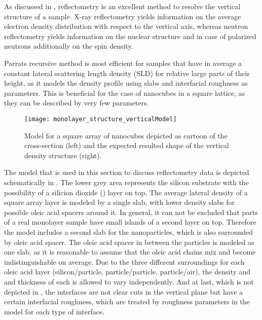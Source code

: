 \documentclass[\main/dresen_thesis.tex]{subfiles}
\begin{document}
  As discussed in , reflectometry is an excellent method to resolve the vertical structure of a sample.
  X-ray reflectometry yields information on the average electron density distribution with respect to the vertical axis, whereas neutron reflectometry yields information on the nuclear structure and in case of polarized neutrons additionally on the spin density.

  Parrats recursive method is most efficient for samples that have in average a constant lateral scattering length density (SLD) for relative large parts of their height, as it models the density profile using slabs and interfacial roughness as parameters.
  This is beneficial for the case of nanocubes in a square lattice, as they can be described by very few parameters.

  \begin{figure}[tb]
    \centering
    \texttt{[image: monolayer\_structure\_verticalModel]}
    \caption{\label{fig:monolayers:structure:verticalModel}Model for a square array of nanocubes depicted as cartoon of the cross-section (left) and the expected resulted shape of the vertical density structure (right).}
  \end{figure}

  The model that is used in this section to discuss reflectometry data is depicted schematically in .
  The lower grey area represents the silicon substrate with the possibility of a silicion dioxide () layer on top.
  The average lateral density of a square array layer is modeled by a single slab, with lower density slabs for possible oleic acid spacers around it.
  In general, it can not be excluded that parts of a real monolayer sample have small islands of a second layer on top.
  Therefore the model includes a second slab for the nanoparticles, which is also surrounded by oleic acid spacer.
  The oleic acid spacer in between the particles is modeled as one slab, as it is reasonable to assume that the oleic acid chains mix and become indistinguishable on average.
  Due to the three different surroundings for each oleic acid layer (silicon/particle, particle/particle, particle/air), the density and and thickness of each is allowed to vary independently.
  And at last, which is not depicted in , the interfaces are not clear cuts in the vertical plane but have a certain interfacial roughness, which are treated by roughness parameters in the model for each type of interface.
\end{document}
